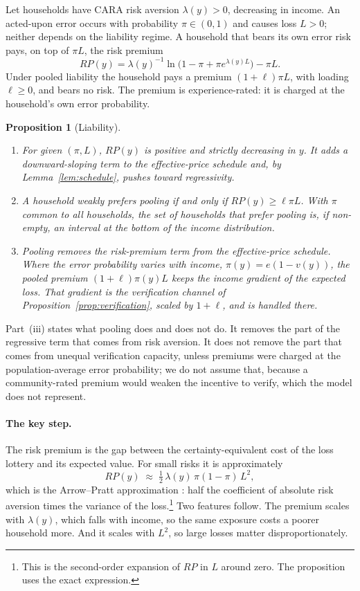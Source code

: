 \documentclass[12pt]{article}
\newtheorem{proposition}{Proposition}
\theoremstyle{remark}
\begin{document}
Let households have CARA risk aversion $\lambda(y)>0$, decreasing in income. An acted-upon error occurs with probability $\pi\in(0,1)$ and causes loss $L>0$; neither depends on the liability regime. A household that bears its own error risk pays, on top of $\pi L$, the risk premium
\[
RP(y)=\lambda(y)^{-1}\ln\!\big(1-\pi+\pi e^{\lambda(y)L}\big)-\pi L .
\]
Under pooled liability the household pays a premium $(1+\ell)\pi L$, with loading $\ell\ge0$, and bears no risk. The premium is experience-rated: it is charged at the household's own error probability.

\begin{proposition}[Liability]\label{prop:liability}
\begin{enumerate}[label=(\roman*),itemsep=0pt]
\item For given $(\pi,L)$, $RP(y)$ is positive and strictly decreasing in $y$. It adds a downward-sloping term to the effective-price schedule and, by Lemma~\ref{lem:schedule}, pushes toward regressivity.
\item A household weakly prefers pooling if and only if $RP(y)\ge\ell\pi L$. With $\pi$ common to all households, the set of households that prefer pooling is, if non-empty, an interval at the bottom of the income distribution.
\item Pooling removes the risk-premium term from the effective-price schedule. Where the error probability varies with income, $\pi(y)=e(1-v(y))$, the pooled premium $(1+\ell)\pi(y)L$ keeps the income gradient of the expected loss. That gradient is the verification channel of Proposition~\ref{prop:verification}, scaled by $1+\ell$, and is handled there.
\end{enumerate}
\end{proposition}

Part~(iii) states what pooling does and does not do. It removes the part of the regressive term that comes from risk aversion. It does not remove the part that comes from unequal verification capacity, unless premiums were charged at the population-average error probability; we do not assume that, because a community-rated premium would weaken the incentive to verify, which the model does not represent.

\paragraph{The key step.} The risk premium is the gap between the certainty-equivalent cost of the loss lottery and its expected value. For small risks it is approximately
\[
RP(y)\;\approx\;\tfrac{1}{2}\,\lambda(y)\,\pi(1-\pi)\,L^2 ,
\]
which is the Arrow--Pratt approximation \citep{pratt1964risk}: half the coefficient of absolute risk aversion times the variance of the loss.\footnote{This is the second-order expansion of $RP$ in $L$ around zero. The proposition uses the exact expression.} Two features follow. The premium scales with $\lambda(y)$, which falls with income, so the same exposure costs a poorer household more. And it scales with $L^2$, so large losses matter disproportionately.
\end{document}
